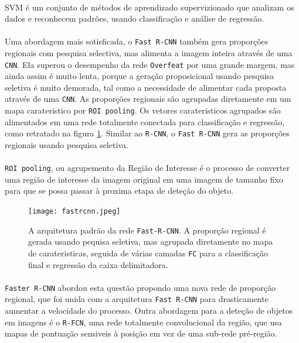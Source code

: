 \paragraph{}
\ac{SVM} é um conjunto de métodos de aprendizado supervizionado que analizam os dados e reconhecem padrões, usando classificação e análise de regressão.

\paragraph{}
Uma abordagem mais sotisficada, o \texttt{Fast \ac{R-CNN}} também gera proporções regionais com pesquisa selectiva, mas alimenta a imagem inteira através de uma \texttt{\ac{CNN}}.
Ela superou o desempenho da rede \texttt{Overfeat} por uma grande margem, mas ainda assim é muito lenta, porque a geração proposicional usando pesquisa seletiva é muito demorada, tal como a necessidade de alimentar cada proposta através de uma \texttt{\ac{CNN}}. As proporções regionais são agrupadas diretamente em um mapa carateristico por \texttt{\ac{ROI} pooling}. Os vetores carateristicos agrupados são alimentados em uma rede totalmente conectada para classificação e regressão, como retratado na figura \ref{img:fastrcnn}. Similar ao \texttt{\ac{R-CNN}}, o \texttt{Fast \ac{R-CNN}} gera as proporções regionais usando pesquisa seletiva.

\paragraph{}
\texttt{\ac{ROI} pooling}, ou agrupemento da Região de Interesse é o processo de converter uma região de interesse da imagem original em uma imagem de tamanho fixo para que se possa passar à proxima etapa de deteção do objeto.

\begin{figure}[h!]
  \label{img:fastrcnn}
  \texttt{[image: fastrcnn.jpeg]}
  \caption{A arquitetura padrão da rede \texttt{Fast-\ac{R-CNN}}. A proporção regional é gerada usando pequisa seletiva, mas agrupada diretamente no mapa de carateristicas, seguida de várias camadas \texttt{FC} para a classificação final e regressão da caixa delimitadora.}
\end{figure}

\paragraph{}
\texttt{Faster \ac{R-CNN}} abordou esta questão propondo uma nova rede de proporção regional, que foi unida com a arquitetura \texttt{Fast \ac{R-CNN}} para drasticamente aumentar a velocidade do processo. Outra abordagem para a deteção de objetos em imagens é o \texttt{\ac{R-FCN}}, uma rede totalmente convolucional da região, que usa mapas de pontuação sensiveis à posição em vez de uma sub-rede pré-região.

